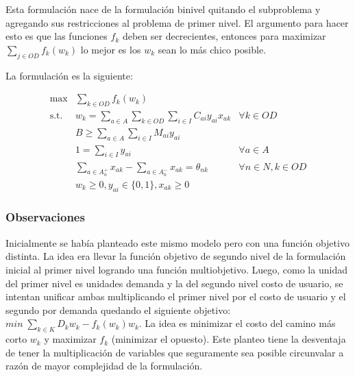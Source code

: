 \documentclass{article}
\begin{document}
  Esta formulación nace de la formulación binivel quitando el subproblema y agregando sus restricciones al problema de primer nivel. El argumento para hacer esto es que las funciones $f_k$ deben ser decrecientes, entonces para maximizar $\sum_{j \in OD}f_k(w_k)$ lo mejor es los $w_k$ sean lo más chico posible.

  La formulación es la siguiente:

  \begin{align}
    \text{max}    & \sum_{k \in OD} f_k(w_k)                                                         & \label{eq:objectivealt} \\
    \text{s.t.}\; & w_k = \sum_{a \in A} \sum_{k \in OD} \sum_{i \in I} C_{ai}y_{ai}x_{ak}           & \forall k \in OD \label{eq:shortestpathalt} \\
                  & B \geq \sum_{a \in A} \sum_{i \in I} M_{ai}y_{ai}                                & \label{eq:respectbudgetalt} \\
                  & 1 = \sum_{i \in I} y_{ai}                                                        & \forall a \in A \label{eq:alwaysoneyalt} \\
                  & \sum_{a \in A_n^+} x_{ak} - \sum_{a \in A_n^-} x_{ak} = \theta_{nk}              & \forall n \in N, k \in OD \label{eq:flowbalancealt} \\
                  & w_k \geq 0, y_{ai} \in \{ 0, 1 \}, x_{ak} \geq 0                                 & \nonumber
  \end{align}

  \subsubsection*{Observaciones}

  Inicialmente se había planteado este mismo modelo pero con una función objetivo distinta. La idea era llevar la función objetivo de segundo nivel de la formulación inicial al primer nivel logrando una función multiobjetivo. Luego, como la unidad del primer nivel es unidades demanda y la del segundo nivel costo de usuario, se intentan unificar ambas multiplicando el primer nivel por el costo de usuario y el segundo por demanda quedando el siguiente objetivo: $min\;\sum_{k \in K} D_kw_k - f_k(w_k)w_k$. La idea es minimizar el costo del camino más corto $w_k$ y maximizar $f_k$ (minimizar el opuesto). Este planteo tiene la desventaja de tener la multiplicación de variables que seguramente sea posible circunvalar a razón de mayor complejidad de la formulación.
\end{document}
